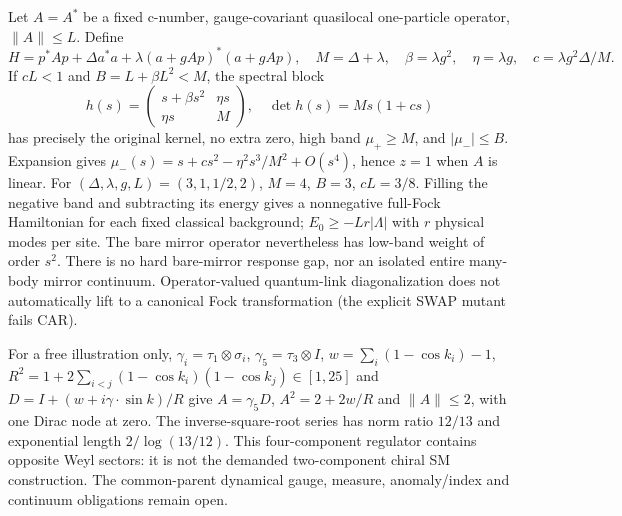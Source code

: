 Let $A=A^*$ be a fixed c-number, gauge-covariant quasilocal one-particle
operator, $\|A\|\le L$. Define
\[
 H=p^*Ap+\Delta a^*a+\lambda(a+gAp)^*(a+gAp),\quad
 M=\Delta+\lambda,\quad\beta=\lambda g^2,\quad\eta=\lambda g,
 \quad c=\lambda g^2\Delta/M.
\]
If $cL<1$ and $B=L+\beta L^2<M$, the spectral block
\[
 h(s)=\begin{pmatrix}s+\beta s^2&\eta s\\\eta s&M\end{pmatrix},\quad
 \det h(s)=Ms(1+cs)
\]
has precisely the original kernel, no extra zero, high band $\mu_+\ge M$,
and $|\mu_-|\le B$. Expansion gives
$\mu_-(s)=s+cs^2-\eta^2s^3/M^2+O(s^4)$, hence $z=1$ when $A$ is linear.
For $(\Delta,\lambda,g,L)=(3,1,1/2,2)$, $M=4$, $B=3$, $cL=3/8$.
Filling the negative band and subtracting its energy gives a nonnegative
full-Fock Hamiltonian for each fixed classical background;
$E_0\ge-Lr|\Lambda|$ with $r$ physical modes per site.
The bare mirror operator nevertheless has low-band weight of order $s^2$.
There is no hard bare-mirror response gap, nor an isolated entire
many-body mirror continuum. Operator-valued quantum-link diagonalization
does not automatically lift to a canonical Fock transformation (the
explicit SWAP mutant fails CAR).

For a free illustration only, $\gamma_i=\tau_1\otimes\sigma_i$,
$\gamma_5=\tau_3\otimes I$, $w=\sum_i(1-\cos k_i)-1$,
$R^2=1+2\sum_{i<j}(1-\cos k_i)(1-\cos k_j)\in[1,25]$ and
$D=I+(w+i\gamma\cdot\sin k)/R$ give $A=\gamma_5D$,
$A^2=2+2w/R$ and $\|A\|\le2$, with one Dirac node at zero.
The inverse-square-root series has norm ratio $12/13$ and exponential
length $2/\log(13/12)$. This four-component regulator contains opposite
Weyl sectors: it is not the demanded two-component chiral SM construction.
The common-parent dynamical gauge, measure, anomaly/index and continuum
obligations remain open.

